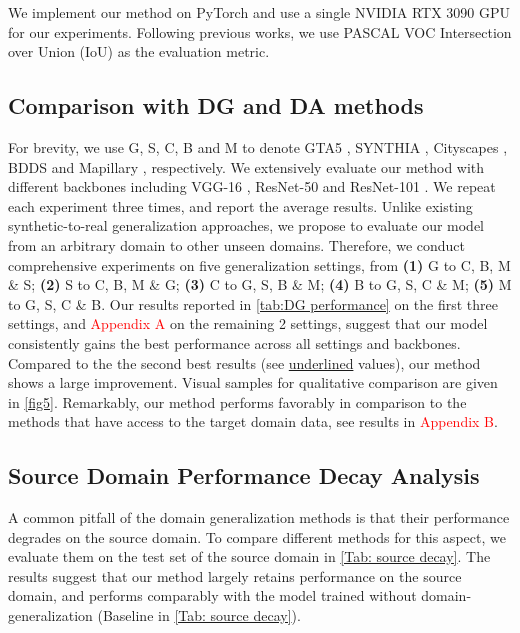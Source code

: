 \documentclass[10pt,twocolumn,letterpaper]{article}
\begin{document}
We implement our method on PyTorch \cite{paszke2017automatic} and use a single NVIDIA RTX 3090 GPU for our experiments. Following previous works, we use PASCAL VOC Intersection over Union (IoU) \cite{everingham2015pascal} as the evaluation metric.



\subsection{Comparison with DG and DA methods}
For brevity, we use G, S, C, B and M to denote GTA5 \cite{richter2016playing}, SYNTHIA \cite{ros2016synthia}, Cityscapes \cite{cordts2016cityscapes}, BDDS \cite{yu2018bdd100k} and Mapillary \cite{neuhold2017mapillary}, respectively. 
We extensively evaluate our method with different backbones including VGG-16 \cite{simonyan2014very}, ResNet-50 and ResNet-101 \cite{he2016deep}. We repeat each experiment three times, and report the average results.
Unlike existing synthetic-to-real generalization approaches, 
we propose to evaluate our model from an arbitrary domain to other unseen domains. Therefore, we conduct comprehensive experiments on five generalization settings, from \textbf{(1)} G to C, B, M \& S; \textbf{(2)} S to C, B, M \& G; \textbf{(3)} C to G, S, B \& M; \textbf{(4)} B to G, S, C \& M; \textbf{(5)} M to G, S, C \& B.
Our results reported in \cref{tab:DG performance} on the first three settings, and \textcolor{red}{Appendix A} on the remaining 2 settings, suggest that our model consistently gains the best performance across all settings and backbones.
Compared to the the second best results (see \underline{underlined} values), our method shows a large improvement. Visual samples for qualitative comparison are given in \cref{fig5}. Remarkably, our method performs favorably in comparison to the methods that have access to the target domain data, see results in \textcolor{red}{Appendix B}.  

\subsection{Source Domain Performance Decay Analysis}

A common pitfall of the domain generalization methods is that their performance degrades on the source domain. To compare different methods for this aspect, we evaluate them on the test set of the source domain in \cref{Tab: source decay}. The results suggest that our method largely retains performance on the source domain, and performs comparably with the model trained without domain-generalization (Baseline in \cref{Tab: source decay}). 
\end{document}
